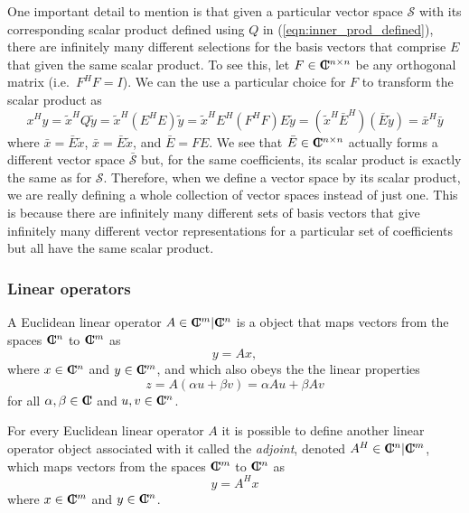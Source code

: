 One important detail to mention is that given a particular vector space
$\mathcal{S}$ with its corresponding scalar product defined using $Q$ in
(\ref{eqn:inner_prod_defined}), there are infinitely many different selections
for the basis vectors that comprise $E$ that given the same scalar product.
To see this, let $F\in\mbox{\textbf{C}}\hspace{-1.1ex}\mbox{l}\hspace{0.4ex}^{n\times{}n}$ be any orthogonal matrix (i.e.\ $F^H
F = I$).  We can the use a particular choice for $F$ to transform the scalar
product as
%
\begin{equation}
x^H y = \tilde{x}^H Q \tilde{y}
= \tilde{x}^H ( E^H E ) \tilde{y}
= \tilde{x}^H E^H ( F^H F ) E \tilde{y}
= ( \tilde{x}^H \bar{E}^H ) ( \bar{E} \tilde{y} )
= \bar{x}^H \bar{y}
\label{eqn:inner_x_y_F_E_prod}
\end{equation}
%
where $\bar{x} = {}\bar{E} {}\tilde{x}$, $\bar{x} = {}\bar{E} {}\tilde{x}$,
and $\bar{E} = F E$.  We see that $\bar{E}\in\mbox{\textbf{C}}\hspace{-1.1ex}\mbox{l}\hspace{0.4ex}^{n\times{}n}$ actually forms
a different vector space $\bar{\mathcal{S}}$ but, for the same coefficients,
its scalar product is exactly the same as for $\mathcal{S}$.  Therefore, when
we define a vector space by its scalar product, we are really defining a whole
collection of vector spaces instead of just one.  This is because there are
infinitely many different sets of basis vectors that give infinitely many
different vector representations for a particular set of coefficients but all
have the same scalar product.

\subsubsection{Linear operators}

A Euclidean linear operator $A\in\mbox{\textbf{C}}\hspace{-1.1ex}\mbox{l}\hspace{0.4ex}^m|\mbox{\textbf{C}}\hspace{-1.1ex}\mbox{l}\hspace{0.4ex}^n$ is a object that maps
vectors from the spaces $\mbox{\textbf{C}}\hspace{-1.1ex}\mbox{l}\hspace{0.4ex}^n$ to $\mbox{\textbf{C}}\hspace{-1.1ex}\mbox{l}\hspace{0.4ex}^m$ as
%
\begin{equation}
y = A x,
\label{eqn:fwd_op_apply}
\end{equation}
%
where $x\in\mbox{\textbf{C}}\hspace{-1.1ex}\mbox{l}\hspace{0.4ex}^n$ and $y\in\mbox{\textbf{C}}\hspace{-1.1ex}\mbox{l}\hspace{0.4ex}^m$, and which also obeys the the linear
properties
%
\begin{equation}
z = A(\alpha u + \beta v) = \alpha A u + \beta A v
\label{eqn:linear_op_properties}
\end{equation}
%
for all $\alpha,\beta\in\mbox{\textbf{C}}\hspace{-1.1ex}\mbox{l}\hspace{0.4ex}$ and $u,v\in\mbox{\textbf{C}}\hspace{-1.1ex}\mbox{l}\hspace{0.4ex}^n$.

For every Euclidean linear operator $A$ it is possible to define another
linear operator object associated with it called the {}\textit{adjoint},
denoted $A^H\in\mbox{\textbf{C}}\hspace{-1.1ex}\mbox{l}\hspace{0.4ex}^n|\mbox{\textbf{C}}\hspace{-1.1ex}\mbox{l}\hspace{0.4ex}^m$, which maps vectors from the spaces $\mbox{\textbf{C}}\hspace{-1.1ex}\mbox{l}\hspace{0.4ex}^m$
to $\mbox{\textbf{C}}\hspace{-1.1ex}\mbox{l}\hspace{0.4ex}^n$ as
%
\begin{equation}
y = A^H x
\label{eqn:adjoint_op_apply}
\end{equation}
%
where $x\in\mbox{\textbf{C}}\hspace{-1.1ex}\mbox{l}\hspace{0.4ex}^m$ and $y\in\mbox{\textbf{C}}\hspace{-1.1ex}\mbox{l}\hspace{0.4ex}^n$.

